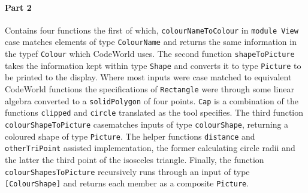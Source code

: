 \documentclass[11pt]{article}
\begin{document}
\paragraph{Part 2} Contains four functions the first of which, \verb|colourNameToColour| in \verb|module View|  case matches elements of  type \verb|ColourName| and returns the same information in the typef \verb|Colour| which CodeWorld uses. The second function \verb|shapeToPicture| takes the information kept within  type \verb|Shape| and converts it to type \verb|Picture| to be printed to the display. Where most inputs were case matched to equivalent CodeWorld functions the specifications of \verb|Rectangle| were through some linear algebra converted to a \verb|solidPolygon| of four points.  \verb|Cap| is a combination of the functions \verb|clipped| and \verb|circle| translated as the tool specifies. The third function \verb|colourShapeToPicture| casematches inputs of type \verb|colourShape|, returning a coloured shape of type \verb|Picture|. The helper functions \verb|distance| and \verb|otherTriPoint| assisted implementation, the former calculating circle radii and the latter the third point of the isosceles triangle. Finally, the function \verb|colourShapesToPicture| recursively runs through an input of type \verb|[ColourShape]| and returns each member as a composite \verb|Picture|.
\end{document}
